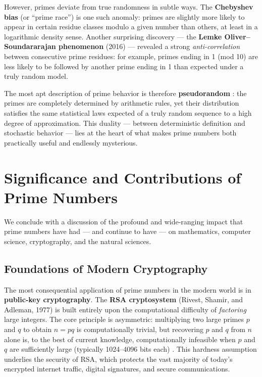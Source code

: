 \documentclass[11pt]{article}
\theoremstyle{plain}
\theoremstyle{definition}
\theoremstyle{remark}
\begin{document}
\par However, primes deviate from true randomness in subtle ways. The \textbf{Chebyshev bias} (or ``prime race'') is one such anomaly: primes are slightly more likely to appear in certain residue classes modulo a given number than others, at least in a logarithmic density sense. Another surprising discovery --- the \textbf{Lemke Oliver--Soundararajan phenomenon} \cite{lemke_oliver_2016} (2016) --- revealed a strong \textit{anti-correlation} between consecutive prime residues: for example, primes ending in 1 (mod 10) are less likely to be followed by another prime ending in 1 than expected under a truly random model.

\par The most apt description of prime behavior is therefore \textbf{pseudorandom} \cite{tao_pseudorandom_2007}: the primes are completely determined by arithmetic rules, yet their distribution satisfies the same statistical laws expected of a truly random sequence to a high degree of approximation. This duality --- between deterministic definition and stochastic behavior --- lies at the heart of what makes prime numbers both practically useful and endlessly mysterious.

\section{Significance and Contributions of Prime Numbers}

\par We conclude with a discussion of the profound and wide-ranging impact that prime numbers have had — and continue to have — on mathematics, computer science, cryptography, and the natural sciences.

\subsection{Foundations of Modern Cryptography}

\par The most consequential application of prime numbers in the modern world is in \textbf{public-key cryptography}. The \textbf{RSA cryptosystem} \cite{rivest_rsa_1978} (Rivest, Shamir, and Adleman, 1977) is built entirely upon the computational difficulty of \textit{factoring} large integers. The core principle is asymmetric: multiplying two large primes $p$ and $q$ to obtain $n = pq$ is computationally trivial, but recovering $p$ and $q$ from $n$ alone is, to the best of current knowledge, computationally infeasible when $p$ and $q$ are sufficiently large (typically 1024--4096 bits each) \cite{koblitz_crypto_1994}. This hardness assumption underlies the security of RSA, which protects the vast majority of today's encrypted internet traffic, digital signatures, and secure communications.
\end{document}
